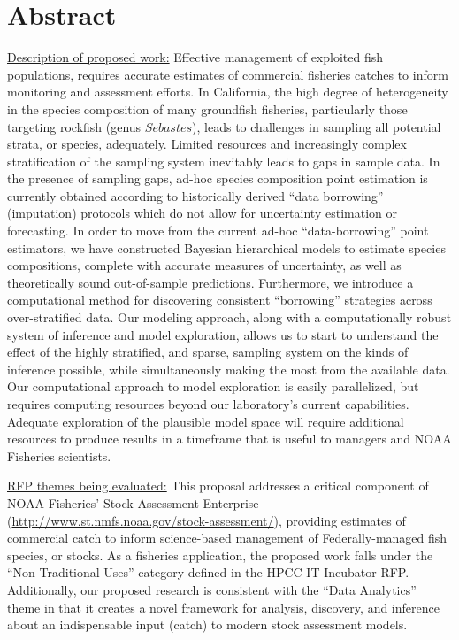 \documentclass[12pt]{article}
\begin{document}
\clearpage
{}

%
%

\section{Abstract}
%
\underline{Description of proposed work:} 
Effective management of exploited fish populations, requires accurate estimates
of commercial fisheries catches to inform monitoring and
assessment efforts. In California, the high degree of heterogeneity in
the species composition of many groundfish fisheries, particularly those
targeting rockfish (genus $Sebastes$), leads to challenges in sampling all
potential strata, or species, adequately. Limited resources and
increasingly complex stratification of the sampling system inevitably
leads to gaps in sample data. In the presence of sampling gaps, ad-hoc
species composition point estimation is currently obtained according to
historically derived ``data borrowing'' (imputation) protocols which do not allow for
uncertainty estimation or forecasting. In order to move from the current
ad-hoc ``data-borrowing'' point estimators, we have
constructed Bayesian hierarchical models to estimate species
compositions, complete with accurate measures of uncertainty, as well as
theoretically sound out-of-sample predictions. Furthermore, we introduce
a computational method for discovering consistent ``borrowing''
strategies across over-stratified data. Our modeling approach, along with
a computationally robust system of inference and model exploration,
allows us to start to understand the effect of the highly stratified,
and sparse, sampling system on the kinds of inference possible, while
simultaneously making the most from the available data.
Our computational approach to model exploration is easily parallelized, but requires computing resources beyond our laboratory's current capabilities.
Adequate exploration of the plausible model space will require additional resources to produce results in a timeframe that is useful to managers and NOAA Fisheries scientists.

%
\underline{RFP themes being evaluated:}
This proposal addresses a critical component of NOAA
Fisheries’ Stock Assessment Enterprise (\href{http://www.st.nmfs.noaa.gov/stock-assessment/}{http://www.st.nmfs.noaa.gov/stock-assessment/}), 
providing estimates of commercial catch to inform science-based
management of Federally-managed fish species, or stocks. As a fisheries application, the
proposed work falls under the “Non-Traditional Uses” category defined in the HPCC IT
Incubator RFP. Additionally, our proposed research is consistent with the “Data Analytics”
theme in that it creates a novel framework for analysis, discovery, and inference about an
indispensable input (catch) to modern stock assessment models.
\end{document}
